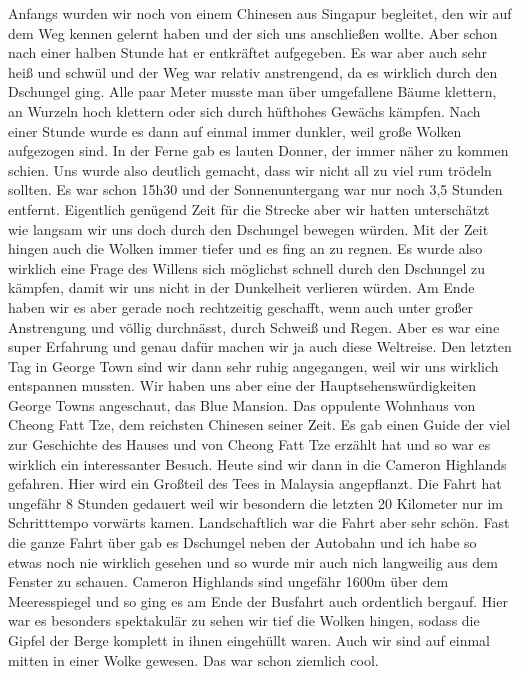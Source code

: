 \documentclass[11pt]{book}
\begin{document}
Anfangs wurden wir noch von einem Chinesen aus Singapur begleitet, den wir auf dem Weg kennen gelernt haben und der sich uns anschließen 
wollte. Aber schon nach einer halben Stunde hat er entkräftet aufgegeben. Es war aber auch sehr heiß und schwül und der Weg war 
relativ anstrengend, da es wirklich durch den Dschungel ging. Alle paar Meter musste man über umgefallene Bäume klettern, an Wurzeln 
hoch klettern oder sich durch hüfthohes Gewächs kämpfen. Nach einer Stunde wurde es dann auf einmal immer dunkler, weil große 
Wolken aufgezogen sind. In der Ferne gab es lauten Donner, der immer näher zu kommen schien. Uns wurde also deutlich gemacht, dass 
wir nicht all zu viel rum trödeln sollten. Es war schon 15h30 und der Sonnenuntergang war nur noch 3,5 Stunden entfernt. Eigentlich 
genügend Zeit für die Strecke aber wir hatten unterschätzt wie langsam wir uns doch durch den Dschungel bewegen würden. Mit der Zeit
hingen auch die Wolken immer tiefer und es fing an zu regnen. Es wurde also wirklich eine Frage des Willens sich möglichst schnell 
durch den Dschungel zu kämpfen, damit wir uns nicht in der Dunkelheit verlieren würden. Am Ende haben wir es aber gerade noch rechtzeitig 
geschafft, wenn auch unter großer Anstrengung und völlig durchnässt, durch Schweiß und Regen. Aber es war eine super Erfahrung 
und genau dafür machen wir ja auch diese Weltreise. Den letzten Tag in George Town sind wir dann sehr ruhig angegangen, weil wir 
uns wirklich entspannen mussten. Wir haben uns aber eine der Hauptsehenswürdigkeiten George Towns angeschaut, das Blue Mansion. 
Das oppulente Wohnhaus von Cheong Fatt Tze, dem reichsten Chinesen seiner Zeit. Es gab einen Guide der viel zur Geschichte des Hauses 
und von Cheong Fatt Tze erzählt hat und so war es wirklich ein interessanter Besuch.
Heute sind wir dann in die Cameron Highlands gefahren. Hier wird ein Großteil des Tees in Malaysia angepflanzt. Die Fahrt hat ungefähr 
8 Stunden gedauert weil wir besondern die letzten 20 Kilometer nur im Schritttempo vorwärts kamen. Landschaftlich war die Fahrt 
aber sehr schön. Fast die ganze Fahrt über gab es Dschungel neben der Autobahn und ich habe so etwas noch nie wirklich gesehen und 
so wurde mir auch nich langweilig aus dem Fenster zu schauen. Cameron Highlands sind ungefähr 1600m über dem Meeresspiegel und so 
ging es am Ende der Busfahrt auch ordentlich bergauf. Hier war es besonders spektakulär zu sehen wir tief die Wolken hingen, sodass 
die Gipfel der Berge komplett in ihnen eingehüllt waren. Auch wir sind auf einmal mitten in einer Wolke gewesen. Das war schon 
ziemlich cool.
\end{document}
